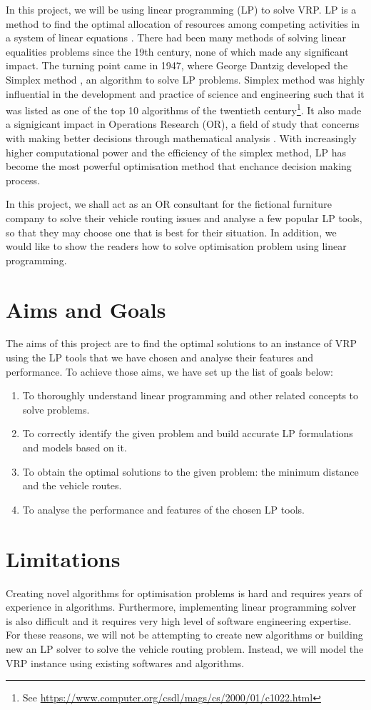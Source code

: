 In this project, we will be using linear programming (LP) to solve VRP. LP is a method to find the optimal allocation
of resources among competing activities in a system of linear equations \cite{APMBradley}. There had been many methods of solving linear equalities
problems since the 19th century, none of which made any significant impact. The turning point came in 1947, where George Dantzig
developed the Simplex method \cite{wiki:SA}, an algorithm to solve LP problems. Simplex method was highly influential
in the development and practice of science and engineering such that it was
listed as one of the top 10 algorithms of the twentieth century\footnote{See \url{https://www.computer.org/csdl/mags/cs/2000/01/c1022.html}}. It also made a signigicant impact in
 Operations Research (OR), a field of study that concerns with making better decisions through mathematical analysis \cite{wiki:OR}.
 With increasingly higher computational power and
the efficiency of the simplex method, LP has become the most powerful optimisation method that enchance decision making
process.

In this project, we shall act as an OR consultant for the fictional furniture company to solve their vehicle
routing issues and analyse a few popular LP tools, so that they may choose one that is best for their situation.
In addition, we would like to show the readers how to solve optimisation problem using linear programming.

\section{Aims and Goals}
The aims of this project are to find the optimal solutions to an instance of VRP using the LP tools that we have chosen and analyse their features and
performance.
To achieve those aims, we have set up the list of goals below:
\begin{enumerate}
\item To thoroughly understand linear programming and other related concepts to solve problems.
\item To correctly identify the given problem and build accurate LP formulations and models based on it.
\item To obtain the optimal solutions to the given problem: the minimum distance and the vehicle routes.
\item To analyse the performance and features of the chosen LP tools.
\end{enumerate}

\section{Limitations}
Creating novel algorithms for optimisation problems is hard and requires years of experience in algorithms. Furthermore,
implementing linear programming solver is also difficult and it requires very high level of software engineering expertise.
 For these reasons, we will not be attempting to create new algorithms or building new an LP solver to solve
the vehicle routing problem. Instead, we will model the VRP instance using existing softwares and algorithms.

